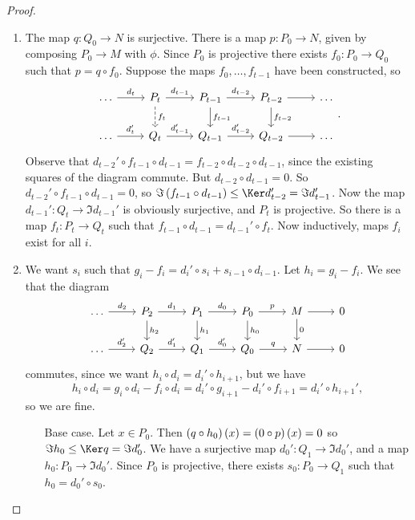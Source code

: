 \begin{proof}
\hfill
\begin{enumerate}
\item The map $ q : Q_0 \to N $ is surjective. There is a map $ p : P_0 \to N $, given by composing $ P_0 \to M $ with $ \phi $. Since $ P_0 $ is projective there exists $ f_0 : P_0 \to Q_0 $ such that $ p = q \circ f_0 $. Suppose the maps $ f_0, \dots, f_{t - 1} $ have been constructed, so
$$
\begin{tikzcd}
\dots \arrow{r}{d_t} & P_t \arrow{r}{d_{t - 1}} \arrow[dashed]{d}{f_t} & P_{t - 1} \arrow{r}{d_{t - 2}} \arrow{d}{f_{t - 1}} & P_{t - 2} \arrow{d}{f_{t - 2}} \arrow{r} & \dots \\
\dots \arrow{r}{d_t'} & Q_t \arrow{r}{d_{t - 1}'} & Q_{t - 1} \arrow{r}{d_{t - 2}'} & Q_{t - 2} \arrow{r} & \dots
\end{tikzcd}.
$$
Observe that $ d_{t - 2}' \circ f_{t - 1} \circ d_{t - 1} = f_{t - 2} \circ d_{t - 2} \circ d_{t - 1} $, since the existing squares of the diagram commute. But $ d_{t - 2} \circ d_{t - 1} = 0 $. So $ d_{t - 2}' \circ f_{t - 1} \circ d_{t - 1} = 0 $, so $ \Im \br{f_{t - 1} \circ d_{t - 1}} \le \Ker d_{t - 2}' = \Im d_{t - 1}' $. Now the map $ d_{t - 1}' : Q_t \to \Im d_{t - 1}' $ is obviously surjective, and $ P_t $ is projective. So there is a map $ f_t : P_t \to Q_t $ such that $ f_{t - 1} \circ d_{t - 1} = d_{t - 1}' \circ f_t $. Now inductively, maps $ f_i $ exist for all $ i $.
\item We want $ s_i $ such that $ g_i - f_i = d_i' \circ s_i + s_{i - 1} \circ d_{i - 1} $. Let $ h_i = g_i - f_i $. We see that the diagram
$$
\begin{tikzcd}
\dots \arrow{r}{d_2} & P_2 \arrow{r}{d_1} \arrow{d}{h_2} & P_1 \arrow{r}{d_0} \arrow{d}{h_1} & P_0 \arrow{r}{p} \arrow{d}{h_0} & M \arrow{r} \arrow{d}{0} & 0 \\
\dots \arrow{r}{d_2'} & Q_2 \arrow{r}{d_1'} & Q_1 \arrow{r}{d_0'} & Q_0 \arrow{r}{q} & N \arrow{r} & 0
\end{tikzcd}
$$
commutes, since we want $ h_i \circ d_i = d_i' \circ h_{i + 1} $, but we have
$$ h_i \circ d_i = g_i \circ d_i - f_i \circ d_i = d_i' \circ g_{i + 1} - d_i' \circ f_{i + 1} = d_i' \circ h_{i + 1}', $$
so we are fine.
\begin{itemize}[leftmargin=1in]
\item[Base case.] Let $ x \in P_0 $. Then $ \br{q \circ h_0}\br{x} = \br{0 \circ p}\br{x} = 0 $ so $ \Im h_0 \le \Ker q = \Im d_0' $. We have a surjective map $ d_0' : Q_1 \to \Im d_0' $, and a map $ h_0 : P_0 \to \Im d_0' $. Since $ P_0 $ is projective, there exists $ s_0 : P_0 \to Q_1 $ such that $ h_0 = d_0' \circ s_0 $.

\end{itemize}
\end{enumerate}
\end{proof}

